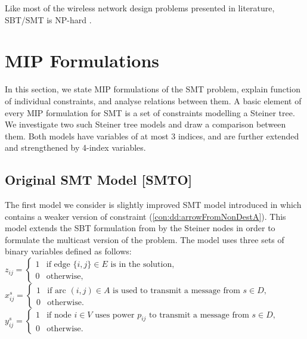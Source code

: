 Like most of the wireless network design problems presented in literature, SBT/SMT is NP-hard \cite{Haugland11Compact}.

\section{MIP Formulations}
\label{sec:ILP}

In this section, we state MIP formulations of the SMT problem, explain function of individual constraints, and analyse relations between them. A basic element of every MIP formulation for SMT is a set of constraints modelling a Steiner tree. We investigate two such Steiner tree models and draw a comparison  between them. Both models have variables of at most 3 indices, and are further extended and strengthened by 4-index variables.
\subsection{Original SMT Model [SMTO]}
The first model we consider is slightly improved SMT model introduced in \cite{ivanova16isco} which contains a weaker version of constraint (\ref{con:dd:arrowFromNonDestA}). This model extends the SBT formulation from \cite{Haugland12Dual} by the Steiner nodes in order to formulate the multicast version of the problem. The model uses three sets of binary variables defined as follows:
\newline\newline
  $z_{ij}=
	\begin{cases}
    1 & \text{if edge $\{i,j\} \in E$ is in the solution},\\
    0 & \text{otherwise},
  \end{cases}$
\newline\newline
  $x^{s}_{ij}=
	\begin{cases}
    1 & \text{if arc $(i,j) \in A$ is used to transmit a message from $s\in D$},\\
    0 & \text{otherwise}.
  \end{cases}$
  \newline\newline
  $y^s_{ij}=
	\begin{cases}
    1 & \text{if node $i \in V$ uses power $p_{ij}$ to transmit a message from $s\in D$},\\
    0 & \text{otherwise}.
  \end{cases}$
\newline
\newline    
